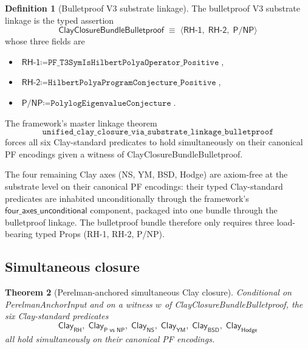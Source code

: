\documentclass[11pt,a4paper]{amsart}
\theoremstyle{plain}
\newtheorem{theorem}{Theorem}[section]
\theoremstyle{definition}
\newtheorem{definition}[theorem]{Definition}
\begin{document}
\begin{definition}[Bulletproof V3 substrate linkage]\label{def:bulletproof-v3}
The bulletproof V3 substrate linkage is the typed assertion
\[
\textsf{ClayClosureBundleBulletproof} \;\equiv\; \langle \textsf{RH-1},\;\textsf{RH-2},\;\textsf{P/NP}\rangle
\]
whose three fields are
\begin{itemize}[itemsep=2pt]
\item $\textsf{RH-1} \coloneqq \texttt{PF\_T3SymIsHilbertPolyaOperator\_Positive}$,
\item $\textsf{RH-2} \coloneqq \texttt{HilbertPolyaProgramConjecture\_Positive}$,
\item $\textsf{P/NP} \coloneqq \texttt{PolylogEigenvalueConjecture}$.
\end{itemize}
The framework's master linkage theorem
\[
\texttt{unified\_clay\_closure\_via\_substrate\_linkage\_bulletproof}
\]
forces all six Clay-standard predicates to hold simultaneously on their canonical PF encodings given a witness of \textsf{ClayClosureBundleBulletproof}.
\end{definition}

The four remaining Clay axes (NS, YM, BSD, Hodge) are axiom-free at the substrate level on their canonical PF encodings: their typed Clay-standard predicates are inhabited unconditionally through the framework's $\textsf{four\_axes\_unconditional}$ component, packaged into one bundle through the bulletproof linkage. The bulletproof bundle therefore only requires three load-bearing typed Props (\textsf{RH-1}, \textsf{RH-2}, \textsf{P/NP}).

\subsection{Simultaneous closure}

\begin{theorem}[Perelman-anchored simultaneous Clay closure]\label{thm:perelman-simultaneous}
Conditional on \textsf{PerelmanAnchorInput} and on a witness $w$ of \textsf{ClayClosureBundleBulletproof}, the six Clay-standard predicates
\[
\textsf{Clay}_{\textsf{RH}},\;\textsf{Clay}_{\textsf{P vs NP}},\;\textsf{Clay}_{\textsf{NS}},\;\textsf{Clay}_{\textsf{YM}},\;\textsf{Clay}_{\textsf{BSD}},\;\textsf{Clay}_{\textsf{Hodge}}
\]
all hold simultaneously on their canonical PF encodings.
\end{theorem}
\end{document}
